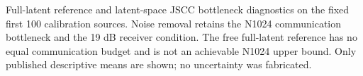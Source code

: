 Full-latent reference and latent-space JSCC bottleneck diagnostics on the fixed first 100 calibration sources. Noise removal retains the N1024 communication bottleneck and the 19 dB receiver condition. The free full-latent reference has no equal communication budget and is not an achievable N1024 upper bound. Only published descriptive means are shown; no uncertainty was fabricated.
